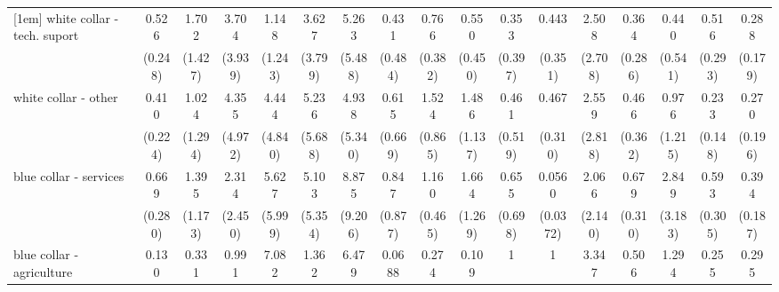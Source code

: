 {\begin{tabular}{l*{16}{c}}
[1em]
white collar - tech. suport&       0.526         &       1.702         &       3.704         &       1.148         &       3.627         &       5.263         &       0.431         &       0.766         &       0.550         &       0.353         &       0.443         &       2.508         &       0.364         &       0.440         &       0.516         &       0.288\sym{*}  \\
                    &     (0.248)         &     (1.427)         &     (3.939)         &     (1.243)         &     (3.799)         &     (5.488)         &     (0.484)         &     (0.382)         &     (0.450)         &     (0.397)         &     (0.351)         &     (2.708)         &     (0.286)         &     (0.541)         &     (0.293)         &     (0.179)         \\
[1em]
white collar - other&       0.410         &       1.024         &       4.355         &       4.444         &       5.236         &       4.938         &       0.615         &       1.524         &       1.486         &       0.461         &       0.467         &       2.559         &       0.466         &       0.976         &       0.233\sym{*}  &       0.270         \\
                    &     (0.224)         &     (1.294)         &     (4.972)         &     (4.840)         &     (5.688)         &     (5.340)         &     (0.669)         &     (0.865)         &     (1.137)         &     (0.519)         &     (0.310)         &     (2.818)         &     (0.362)         &     (1.215)         &     (0.148)         &     (0.196)         \\
[1em]
blue collar - services&       0.669         &       1.395         &       2.314         &       5.627         &       5.103         &       8.875\sym{*}  &       0.847         &       1.160         &       1.664         &       0.655         &      0.0560\sym{***}&       2.066         &       0.679         &       2.849         &       0.593         &       0.394\sym{*}  \\
                    &     (0.280)         &     (1.173)         &     (2.450)         &     (5.999)         &     (5.354)         &     (9.206)         &     (0.877)         &     (0.465)         &     (1.269)         &     (0.698)         &    (0.0372)         &     (2.140)         &     (0.310)         &     (3.183)         &     (0.305)         &     (0.187)         \\
[1em]
blue collar - agriculture&       0.130         &       0.331         &       0.991         &       7.082         &       1.362         &       6.479         &      0.0688         &       0.274         &       0.109         &           1         &           1         &       3.347         &       0.506         &       1.294         &       0.255         &       0.295         \\

\end{tabular}}
